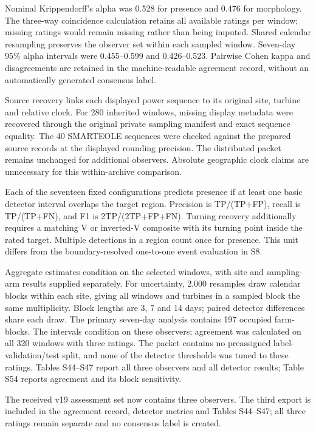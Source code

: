 \documentclass[a4paper,11pt]{article}
\newcounter{none}
\begin{document}
Nominal Krippendorff's alpha was 0.528 for presence and 0.476 for morphology. The three-way coincidence calculation retains all available ratings per window; missing ratings would remain missing rather than being imputed. Shared calendar resampling preserves the observer set within each sampled window. Seven-day 95\% alpha intervals were 0.455--0.599 and 0.426--0.523. Pairwise Cohen kappa and disagreements are retained in the machine-readable agreement record, without an automatically generated consensus label.

Source recovery links each displayed power sequence to its original site, turbine and relative clock. For 280 inherited windows, missing display metadata were recovered through the original private sampling manifest and exact sequence equality. The 40 SMARTEOLE sequences were checked against the prepared source records at the displayed rounding precision. The distributed packet remains unchanged for additional observers. Absolute geographic clock claims are unnecessary for this within-archive comparison.

Each of the seventeen fixed configurations predicts presence if at least one basic detector interval overlaps the target region. Precision is TP/(TP+FP), recall is TP/(TP+FN), and F1 is 2TP/(2TP+FP+FN). Turning recovery additionally requires a matching V or inverted-V composite with its turning point inside the rated target. Multiple detections in a region count once for presence. This unit differs from the boundary-resolved one-to-one event evaluation in S8.

Aggregate estimates condition on the selected windows, with site and sampling-arm results supplied separately. For uncertainty, 2,000 resamples draw calendar blocks within each site, giving all windows and turbines in a sampled block the same multiplicity. Block lengths are 3, 7 and 14 days; paired detector differences share each draw. The primary seven-day analysis contains 197 occupied farm-blocks. The intervals condition on these observers; agreement was calculated on all 320 windows with three ratings. The packet contains no preassigned label-validation/test split, and none of the detector thresholds was tuned to these ratings. Tables S44--S47 report all three observers and all detector results; Table S54 reports agreement and its block sensitivity.

The received v19 assessment set now contains three observers. The third export is included in the agreement record, detector metrics and Tables S44--S47; all three ratings remain separate and no consensus label is created.
\end{document}
